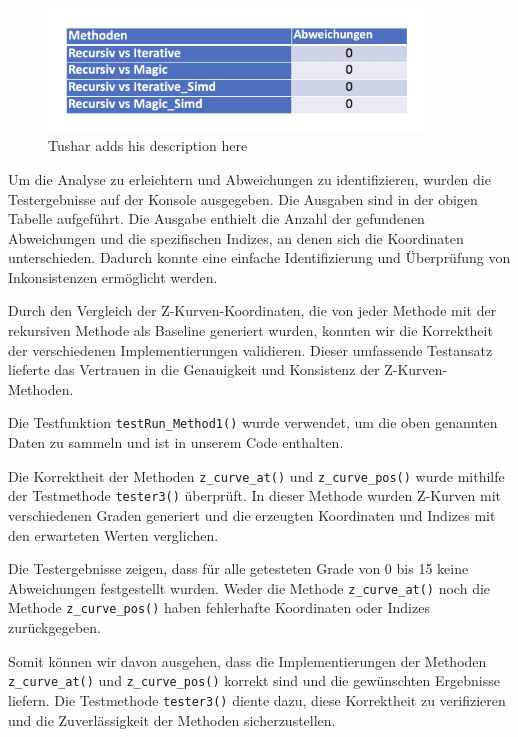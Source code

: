 \documentclass[course=erap]{aspdoc}
\begin{document}
\begin{figure}[H]
  \centering
  \includegraphics[width=0.9\textwidth]{data}
  \caption{Tushar adds his description here}
  \label{fig:data}
\end{figure}

\noindent Um die Analyse zu erleichtern und Abweichungen zu identifizieren, wurden die Testergebnisse auf der Konsole ausgegeben. Die Ausgaben sind in der obigen Tabelle aufgeführt. Die Ausgabe enthielt die Anzahl der gefundenen Abweichungen und die spezifischen Indizes, an denen sich die Koordinaten unterschieden. Dadurch konnte eine einfache Identifizierung und Überprüfung von Inkonsistenzen ermöglicht werden.

\noindent Durch den Vergleich der Z-Kurven-Koordinaten, die von jeder Methode mit der rekursiven Methode als Baseline generiert wurden, konnten wir die Korrektheit der verschiedenen Implementierungen validieren. Dieser umfassende Testansatz lieferte das Vertrauen in die Genauigkeit und Konsistenz der Z-Kurven-Methoden.

\noindent Die Testfunktion \texttt{testRun\_Method1()} wurde verwendet, um die oben genannten Daten zu sammeln und ist in unserem Code enthalten.

\noindent Die Korrektheit der Methoden \texttt{z\_curve\_at()} und \texttt{z\_curve\_pos()} wurde mithilfe der Testmethode \texttt{tester3()} überprüft. In dieser Methode wurden Z-Kurven mit verschiedenen Graden generiert und die erzeugten Koordinaten und Indizes mit den erwarteten Werten verglichen.

\noindent Die Testergebnisse zeigen, dass für alle getesteten Grade von 0 bis 15 keine Abweichungen festgestellt wurden. Weder die Methode \texttt{z\_curve\_at()} noch die Methode \texttt{z\_curve\_pos()} haben fehlerhafte Koordinaten oder Indizes zurückgegeben.

\noindent Somit können wir davon ausgehen, dass die Implementierungen der Methoden \texttt{z\_curve\_at()} und \texttt{z\_curve\_pos()} korrekt sind und die gewünschten Ergebnisse liefern. Die Testmethode \texttt{tester3()} diente dazu, diese Korrektheit zu verifizieren und die Zuverlässigkeit der Methoden sicherzustellen.
\end{document}
